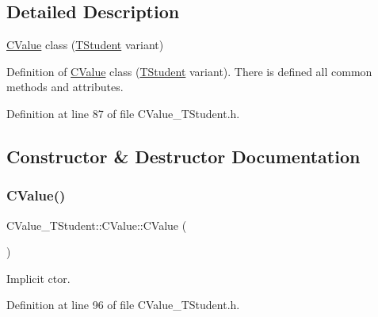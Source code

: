 \subsection{Detailed Description}
\hyperlink{class_c_value___t_student_1_1_c_value}{C\+Value} class ({\ttfamily \hyperlink{struct_c_value___t_student_1_1_t_student}{T\+Student}} variant) 

Definition of \hyperlink{class_c_value___t_student_1_1_c_value}{C\+Value} class ({\ttfamily \hyperlink{struct_c_value___t_student_1_1_t_student}{T\+Student}} variant). There is defined all common methods and attributes. 

Definition at line 87 of file C\+Value\+\_\+\+T\+Student.\+h.



\subsection{Constructor \& Destructor Documentation}
\mbox{\label{class_c_value___t_student_1_1_c_value_ab22934b570a1682fa933b124725230bc}} 
\subsubsection{\texorpdfstring{C\+Value()}{CValue()}\hspace{0.1cm}{\footnotesize\ttfamily [1/4]}}
{\footnotesize\ttfamily C\+Value\+\_\+\+T\+Student\+::\+C\+Value\+::\+C\+Value (\begin{DoxyParamCaption}{ }\end{DoxyParamCaption})\hspace{0.3cm}{\ttfamily [inline]}}



Implicit c\textquotesingle{}tor. 



Definition at line 96 of file C\+Value\+\_\+\+T\+Student.\+h.

\mbox{\label{class_c_value___t_student_1_1_c_value_ae7e9f4452f6d3748cc084a95948b211c}} 
